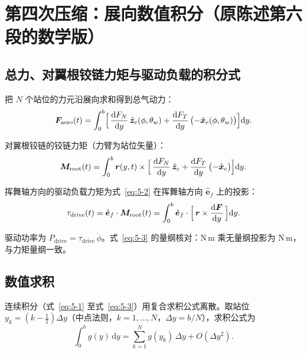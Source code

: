 \documentclass[11pt,a4paper]{ctexart}
\numberwithin{equation}{section}
\begin{document}
\section{第四次压缩：展向数值积分（原陈述第六段的数学版）}\label{sec:integ}

\subsection{总力、对翼根铰链力矩与驱动负载的积分式}

把 $N$ 个站位的力元沿展向求和得到总气动力：
\begin{equation}
  \bm{F}_{\text{aero}}(t) = \int_0^b \Bigl[\,\frac{\mathrm{d}F_N}{\mathrm{d}y}\,\hat{\bm{z}}_c(\phi, \theta_w) + \frac{\mathrm{d}F_T}{\mathrm{d}y}\,\bigl(-\hat{\bm{x}}_c(\phi, \theta_w)\bigr)\Bigr]\mathrm{d}y. \label{eq:5-1}
\end{equation}

对翼根铰链的铰链力矩（力臂为站位矢量）：
\begin{equation}
  \bm{M}_{\text{root}}(t) = \int_0^b \bm{r}(y, t) \times \Bigl[\,\frac{\mathrm{d}F_N}{\mathrm{d}y}\,\hat{\bm{z}}_c + \frac{\mathrm{d}F_T}{\mathrm{d}y}\,\bigl(-\hat{\bm{x}}_c\bigr)\Bigr]\mathrm{d}y. \label{eq:5-2}
\end{equation}

挥舞轴方向的驱动负载力矩为式~\eqref{eq:5-2} 在挥舞轴方向 $\hat{\bm{e}}_f$ 上的投影：
\begin{equation}
  \tau_{\text{drive}}(t) = \hat{\bm{e}}_f \cdot \bm{M}_{\text{root}}(t)
  = \int_0^b \hat{\bm{e}}_f \cdot \Bigl[\,\bm{r} \times \frac{\mathrm{d}\bm{F}}{\mathrm{d}y}\,\Bigr]\mathrm{d}y. \label{eq:5-3}
\end{equation}

驱动功率为 $P_{\text{drive}} = \tau_{\text{drive}}\,\dot{\phi}$。式~\eqref{eq:5-3} 的量纲核对：$\mathrm{N\, m}$ 乘无量纲投影为 $\mathrm{N\, m}$，与力矩量纲一致。

\subsection{数值求积}

连续积分（式~\eqref{eq:5-1} 至式~\eqref{eq:5-3}）用复合求积公式离散。取站位 $y_k = (k - \tfrac{1}{2})\Delta y$（中点法则，$k = 1, \ldots, N$，$\Delta y = b/N$），求积公式为
\begin{equation}
  \int_0^b g(y)\,\mathrm{d}y = \sum_{k=1}^{N} g(y_k)\,\Delta y + O(\Delta y^2). \label{eq:5-4}
\end{equation}
\end{document}
